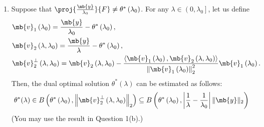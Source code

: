 \begin{exercise}
\begin{enumerate}
\begin{enumerate}
        \item Suppose that $\proj{\frac{\mb{y}}{\lambda_{0}}}{F}\not=\theta^{*}\left(\lambda_{0}\right)$. For any $\lambda \in\left(0, \lambda_{0}\right]$, let us define
          \begin{align*}
             & \mb{v}_{1}\left(\lambda_{0}\right)=
            \frac{\mb{y}}{\lambda_{0}}-\theta^{*}\left(\lambda_{0}\right),                                                                                                                                                                                                                                                      \\
             & \mb{v}_{2}\left(\lambda, \lambda_{0}\right)=\frac{\mb{y}}{\lambda}-\theta^{*}\left(\lambda_{0}\right),                                                                                                                                                                                                           \\
             & \mb{v}_{2}^{\perp}\left(\lambda, \lambda_{0}\right)=\mb{v}_{2}\left(\lambda, \lambda_{0}\right)-\frac{\left\langle\mb{v}_{1}\left(\lambda_{0}\right), \mb{v}_{2}\left(\lambda, \lambda_{0}\right)\right\rangle}{\left\|\mb{v}_{1}\left(\lambda_{0}\right)\right\|_{2}^{2}} \mb{v}_{1}\left(\lambda_{0}\right) .
          \end{align*}
          Then, the dual optimal solution $\theta^{*}(\lambda)$ can be estimated as follows:
          \begin{align*}
            \theta^{*}(\lambda) \in B\left(\theta^{*}\left(\lambda_{0}\right),\left\|\mb{v}_{2}^{\perp}\left(\lambda, \lambda_{0}\right)\right\|_{2}\right) \subseteq B\left(\theta^{*}\left(\lambda_{0}\right),\left|\frac{1}{\lambda}-\frac{1}{\lambda_{0}}\right|\|\mb{y}\|_{2}\right)
          \end{align*}
          (You may use the result in Question 1(b).)
          
      \end{enumerate}
      

\end{enumerate}
\end{exercise}
